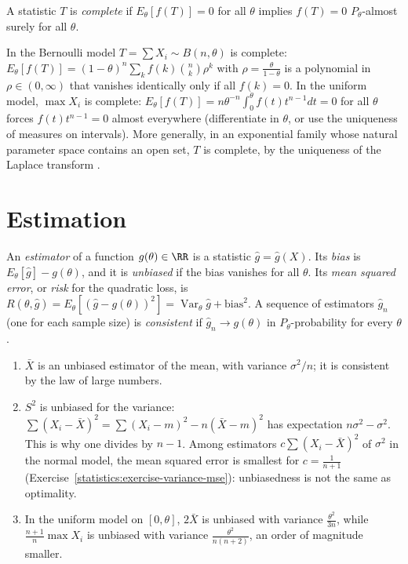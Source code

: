 \begin{definition}\label{statistics:definition-complete}
A statistic $T$ is \emph{complete} if $E_\theta[f(T)] = 0$ for all $\theta$ implies $f(T) = 0$ $P_\theta$-almost surely for all $\theta$.
\end{definition}

\begin{example}\label{statistics:example-complete}
In the Bernoulli model $T = \sum X_i \sim B(n, \theta)$ is complete: $E_\theta[f(T)] = (1 - \theta)^n\sum_kf(k)\binom nk\rho^k$ with $\rho = \frac{\theta}{1 - \theta}$ is a polynomial in $\rho \in (0, \infty)$ that vanishes identically only if all
$f(k) = 0$. In the uniform model, $\max X_i$ is complete: $E_\theta[f(T)] = n\theta^{-n}\int_0^\theta f(t)t^{n-1}dt = 0$ for all $\theta$ forces $f(t)t^{n-1} = 0$ almost everywhere (differentiate in $\theta$, or use the uniqueness of
measures on intervals). More generally, in an exponential family whose natural parameter space contains an open set, $T$ is complete, by the uniqueness of the Laplace transform \cite{lehmann-casella}.
\end{example}

\section{Estimation}\label{statistics:section-estimation}

\begin{definition}\label{statistics:definition-estimator}
An \emph{estimator} of a function $g(\theta) \in \RR$ is a statistic $\hat g = \hat g(X)$. Its \emph{bias} is $E_\theta[\hat g] - g(\theta)$, and it is \emph{unbiased} if the bias vanishes for all $\theta$. Its \emph{mean squared error}, or
\emph{risk} for the quadratic loss, is $R(\theta, \hat g) = E_\theta[(\hat g - g(\theta))^2] = \operatorname{Var}_\theta\hat g + \mathrm{bias}^2$. A sequence of estimators $\hat g_n$ (one for each sample size) is \emph{consistent} if
$\hat g_n \to g(\theta)$ in $P_\theta$-probability for every $\theta$.
\end{definition}

\begin{example}\label{statistics:example-estimators}
\begin{enumerate}
\item $\bar X$ is an unbiased estimator of the mean, with variance $\sigma^2/n$; it is consistent by the law of large numbers.
\item $S^2$ is unbiased for the variance: $\sum(X_i - \bar X)^2 = \sum(X_i - m)^2 - n(\bar X - m)^2$ has expectation $n\sigma^2 - \sigma^2$. This is why one divides by $n - 1$. Among estimators $c\sum(X_i - \bar X)^2$ of $\sigma^2$
in the normal model, the mean squared error is smallest for $c = \frac{1}{n + 1}$ (Exercise~\ref{statistics:exercise-variance-mse}): unbiasedness is not the same as optimality.
\item In the uniform model on $[0, \theta]$, $2\bar X$ is unbiased with variance $\frac{\theta^2}{3n}$, while $\frac{n + 1}{n}\max X_i$ is unbiased with variance $\frac{\theta^2}{n(n + 2)}$, an order of magnitude smaller.
\end{enumerate}
\end{example}

